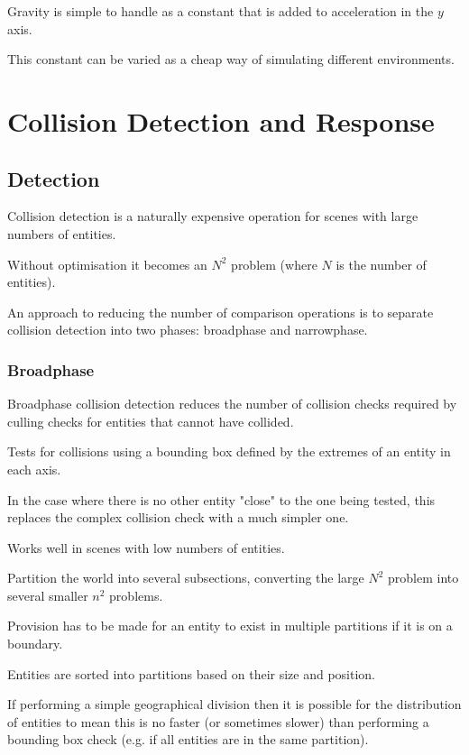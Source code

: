 \documentclass[a4paper]{article}
\begin{document}
Gravity is simple to handle as a constant that is added to acceleration in the
$y$ axis.

This constant can be varied as a cheap way of simulating different environments.

\section{Collision Detection and Response}
\label{sec:collision_detection_and_response}

\subsection{Detection}

Collision detection is a naturally expensive operation for scenes with large
numbers of entities.

Without optimisation it becomes an $N^{2}$ problem (where $N$ is the number of
entities).

An approach to reducing the number of comparison operations is to separate
collision detection into two phases: broadphase and narrowphase.

\subsubsection{Broadphase}

Broadphase collision detection reduces the number of collision checks required
by culling checks for entities that cannot have collided.


Tests for collisions using a bounding box defined by the extremes of an entity
in each axis.

In the case where there is no other entity "close" to the one being tested, this
replaces the complex collision check with a much simpler one.

Works well in scenes with low numbers of entities.


Partition the world into several subsections, converting the large $N^{2}$
problem into several smaller $n^{2}$ problems.

Provision has to be made for an entity to exist in multiple partitions if it is
on a boundary.

Entities are sorted into partitions based on their size and position.

If performing a simple geographical division then it is possible for the
distribution of entities to mean this is no faster (or sometimes slower) than
performing a bounding box check (e.g. if all entities are in the same
partition).
\end{document}
